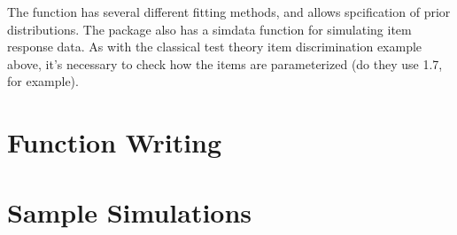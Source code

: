\documentclass[
]{book}
\begin{document}
The function has several different fitting methods, and allows spcification of prior distributions. The package also has a simdata function for simulating item response data. As with the classical test theory item discrimination example above, it's necessary to check how the items are parameterized (do they use 1.7, for example).

\hypertarget{function-writing}{%
\chapter{Function Writing}\label{function-writing}}

\hypertarget{sample-simulations}{%
\chapter{Sample Simulations}\label{sample-simulations}}

  
\end{document}
